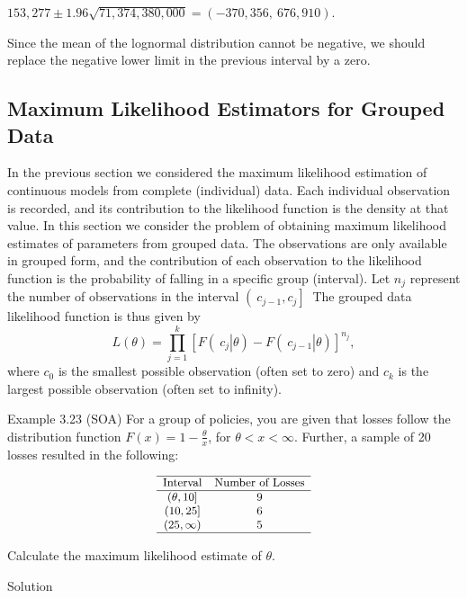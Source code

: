 \documentclass[]{book}
\begin{document}
\(153,277 \pm 1.96\sqrt{71,374,380,000} = \left( - 370,356,\ 676,910 \right)\).

Since the mean of the lognormal distribution cannot be negative, we
should replace the negative lower limit in the previous interval by a
zero.

\subsection{Maximum Likelihood Estimators for Grouped
Data}\label{MLEGrouped}

In the previous section we considered the maximum likelihood estimation
of continuous models from complete (individual) data. Each individual
observation is recorded, and its contribution to the likelihood function
is the density at that value. In this section we consider the problem of
obtaining maximum likelihood estimates of parameters from grouped data.
The observations are only available in grouped form, and the
contribution of each observation to the likelihood function is the
probability of falling in a specific group (interval). Let \(n_{j}\)
represent the number of observations in the interval
\(\left( \left. \ c_{j - 1},c_{j} \right\rbrack \right.\ \) The grouped
data likelihood function is thus given by
\[L\left( \theta \right) = \prod_{j = 1}^{k}\left\lbrack F\left( \left. \ c_{j} \right|\theta \right) - F\left( \left. \ c_{j - 1} \right|\theta \right) \right\rbrack^{n_{j}},\]
where \(c_{0}\) is the smallest possible observation (often set to zero)
and \(c_{k}\) is the largest possible observation (often set to
infinity).

Example 3.23 (SOA) For a group of policies, you are given that losses
follow the distribution function
\(F\left( x \right) = 1 - \frac{\theta}{x}\), for
\(\theta < x < \infty.\) Further, a sample of 20 losses resulted in the
following:

\[
{\small
\begin{matrix}\hline
\text{Interval} & \text{Number of Losses}  \\ \hline
(\theta, 10] & 9 \\
(10, 25] & 6 \\
(25, \infty) & 5  \\ \hline
\end{matrix}
}
\]

Calculate the maximum likelihood estimate of \(\theta\).

Solution
\end{document}
